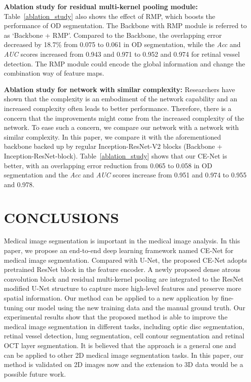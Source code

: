 \documentclass[journal]{IEEEtran}
\begin{document}
\textbf{Ablation study for residual multi-kernel pooling module:} Table~\ref{ablation_study} also shows the effect of RMP, which boosts the performance of OD segmentation. The Backbone with RMP module is referred to as `Backbone + RMP'. Compared to the Backbone, the overlapping error decreased by 18.7\% from 0.075 to 0.061 in OD segmentation, while the  \textit{Acc} and \textit{AUC} scores increased from 0.943 and 0.971 to 0.952 and 0.974 for retinal vessel detection. The RMP module could encode the global information and change the combination way of feature maps.  


\textbf{Ablation study for network with similar complexity:} Researchers have shown that the complexity is an embodiment of the network capability \cite{huang2017densely} and an increased complexity often leads to better performance. Therefore, there is a concern that the improvements might come from the increased complexity of the network.    To ease such a concern, we compare our network with a network with similar complexity. In this paper, we compare it with  the aforementioned backbone backed up by regular Inception-ResNet-V2 blocks (Backbone + Inception-ResNet-block).  Table~\ref{ablation_study} shows that our CE-Net is better, with an overlapping error reduction from 0.065 to 0.058 in OD segmentation and the \textit{Acc} and \textit{AUC} scores increase from 0.951 and 0.974 to 0.955 and 0.978.

\section{CONCLUSIONS}
\label{Conclusion}
Medical image segmentation is important in the medical image analysis. 
In this paper, we propose an end-to-end deep learning framework named CE-Net for medical image segmentation. Compared with U-Net, the proposed CE-Net adopts pretrained ResNet block in the feature encoder. A newly proposed dense atrous convolution block and residual multi-kernel pooling are integrated to the ResNet modified U-Net structure to capture more high-level features and preserve more spatial information. Our method can be applied to a new application by fine-tuning our model using the new training data and the manual ground truth. Our experimental results show that the proposed method is able to improve the medical image segmentation in different tasks, including optic disc segmentation, retinal vessel detection, lung segmentation, cell contour segmentation and retinal OCT layer segmentation. It is believed that the approach is a general one and can be applied to other 2D medical  image segmentation tasks. In this paper, our method is validated on 2D images now and the extension to 3D data would be a possible future work.





\end{document}
